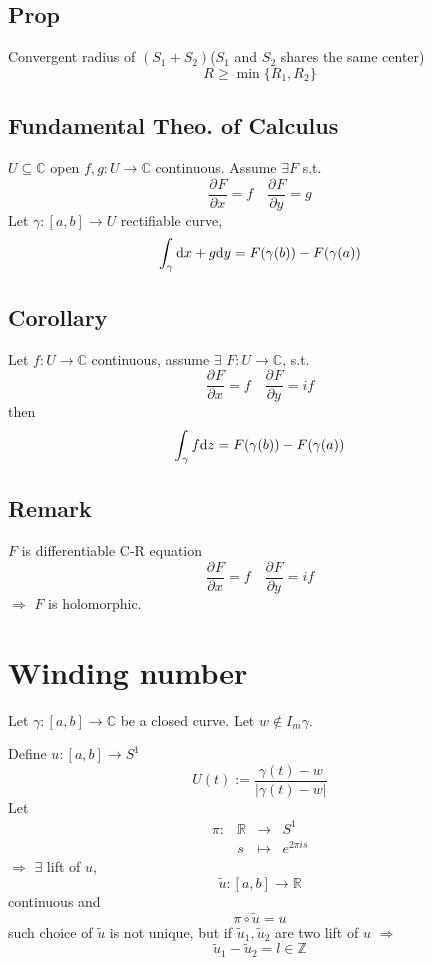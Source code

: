 \documentclass{book}
\newcommand{\abs}[1]{\left\lvert #1 \right\rvert}
\newcommand{\fpart}[3][]{\frac{\partial^{#1}#2}{\partial #3^{#1}}}
\begin{document}
\section{Prop}
Convergent radius of $(S_1+S_2)$($S_1$ and $S_2$ shares the same center)
$$R\geq\min\{R_1,R_2\}$$












\section{Fundamental Theo. of Calculus}
$U\subseteq \mathbb C $ open $f,g:U\to \mathbb C$ continuous. Assume $\exists F$ s.t. $$\fpart{F}{x}=f\quad\fpart{F}{y}=g$$
Let $\gamma:[a,b]\to U$ rectifiable curve,$$\int_\gamma\text d{x}+g\text d y=F(\gamma(b))-F(\gamma(a))$$
\section{Corollary}
Let $f:U\to \mathbb C$ continuous, assume $\exists$ $F:U\to \mathbb C$, s.t. $$\fpart{F}{x}=f\quad \fpart{F}{y}=if$$
then 
$$\int_\gamma f\text dz=F(\gamma(b))-F(\gamma(a))$$
\section{Remark}
$F$ is differentiable C-R equation$$\fpart{F}{x}=f\quad \fpart{F}{y}=if$$
$\Rightarrow$ $F$ is holomorphic.














\chapter{Winding number}
Let $\gamma:[a,b]\to \mathbb C$ be a closed curve. Let $w\notin I_m\gamma$. 


Define $u:[a,b]\to S^1$$$U(t):=\frac{\gamma(t)-w}{\abs{\gamma(t)-w}}$$
Let $$\begin{aligned}
    \pi:&\mathbb R&\to& S^1\\ &s&\mapsto&e^{2\pi is}
\end{aligned}$$
$\Rightarrow$ $\exists$ lift of $u$, $$\tilde u:[a,b]\to \mathbb R$$continuous and $$\pi\circ \tilde u=u$$
such choice of $\tilde u$ is not unique, but if $\tilde u_1,\tilde u_2$ are two lift of $u$ $\Rightarrow$ $$\tilde u_1-\tilde u_2=l\in \mathbb Z$$
\end{document}
